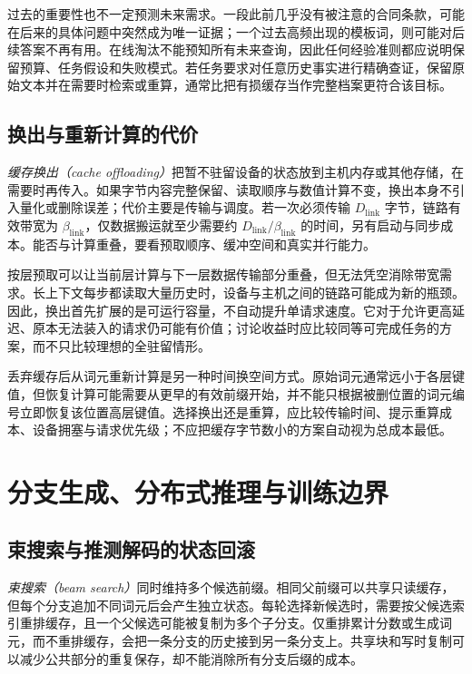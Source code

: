 \documentclass[UTF8,12pt,a4paper,fontset=fandol]{ctexart}
\begin{document}
过去的重要性也不一定预测未来需求。一段此前几乎没有被注意的合同条款，可能在后来的具体问题中突然成为唯一证据；一个过去高频出现的模板词，则可能对后续答案不再有用。在线淘汰不能预知所有未来查询，因此任何经验准则都应说明保留预算、任务假设和失败模式。若任务要求对任意历史事实进行精确查证，保留原始文本并在需要时检索或重算，通常比把有损缓存当作完整档案更符合该目标。

\subsection{换出与重新计算的代价}

\emph{缓存换出（cache offloading）}把暂不驻留设备的状态放到主机内存或其他存储，在需要时再传入。如果字节内容完整保留、读取顺序与数值计算不变，换出本身不引入量化或删除误差；代价主要是传输与调度。若一次必须传输 $D_{\mathrm{link}}$ 字节，链路有效带宽为 $\beta_{\mathrm{link}}$，仅数据搬运就至少需要约 $D_{\mathrm{link}}/\beta_{\mathrm{link}}$ 的时间，另有启动与同步成本。能否与计算重叠，要看预取顺序、缓冲空间和真实并行能力。

按层预取可以让当前层计算与下一层数据传输部分重叠，但无法凭空消除带宽需求。长上下文每步都读取大量历史时，设备与主机之间的链路可能成为新的瓶颈。因此，换出首先扩展的是可运行容量，不自动提升单请求速度。它对于允许更高延迟、原本无法装入的请求仍可能有价值；讨论收益时应比较同等可完成任务的方案，而不只比较理想的全驻留情形。

丢弃缓存后从词元重新计算是另一种时间换空间方式。原始词元通常远小于各层键值，但恢复计算可能需要从更早的有效前缀开始，并不能只根据被删位置的词元编号立即恢复该位置高层键值。选择换出还是重算，应比较传输时间、提示重算成本、设备拥塞与请求优先级；不应把缓存字节数小的方案自动视为总成本最低。

\section{分支生成、分布式推理与训练边界}
\label{sec:kv-extensions}

\subsection{束搜索与推测解码的状态回滚}

\emph{束搜索（beam search）}同时维持多个候选前缀。相同父前缀可以共享只读缓存，但每个分支追加不同词元后会产生独立状态。每轮选择新候选时，需要按父候选索引重排缓存，且一个父候选可能被复制为多个子分支。仅重排累计分数或生成词元，而不重排缓存，会把一条分支的历史接到另一条分支上。共享块和写时复制可以减少公共部分的重复保存，却不能消除所有分支后缀的成本。
\end{document}
